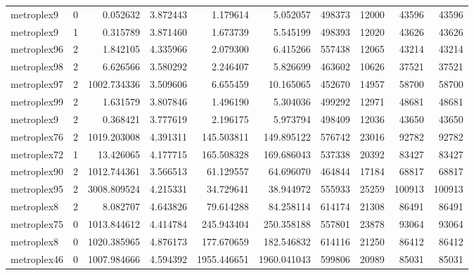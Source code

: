 \begin{longtable}{|l|r|r|r|r|r|r|r|r|r|}
metroplex9 & 0 & 0.052632 & 3.872443 & 1.179614 & 5.052057 & 498373 & 12000 & 43596 & 43596 \\
metroplex9 & 1 & 0.315789 & 3.871460 & 1.673739 & 5.545199 & 498393 & 12020 & 43626 & 43626 \\
metroplex96 & 2 & 1.842105 & 4.335966 & 2.079300 & 6.415266 & 557438 & 12065 & 43214 & 43214 \\
metroplex98 & 2 & 6.626566 & 3.580292 & 2.246407 & 5.826699 & 463602 & 10626 & 37521 & 37521 \\
metroplex97 & 2 & 1002.734336 & 3.509606 & 6.655459 & 10.165065 & 452670 & 14957 & 58700 & 58700 \\
metroplex99 & 2 & 1.631579 & 3.807846 & 1.496190 & 5.304036 & 499292 & 12971 & 48681 & 48681 \\
metroplex9 & 2 & 0.368421 & 3.777619 & 2.196175 & 5.973794 & 498409 & 12036 & 43650 & 43650 \\
metroplex76 & 2 & 1019.203008 & 4.391311 & 145.503811 & 149.895122 & 576742 & 23016 & 92782 & 92782 \\
metroplex72 & 1 & 13.426065 & 4.177715 & 165.508328 & 169.686043 & 537338 & 20392 & 83427 & 83427 \\
metroplex90 & 2 & 1012.744361 & 3.566513 & 61.129557 & 64.696070 & 464844 & 17184 & 68817 & 68817 \\
metroplex95 & 2 & 3008.809524 & 4.215331 & 34.729641 & 38.944972 & 555933 & 25259 & 100913 & 100913 \\
metroplex8 & 2 & 8.082707 & 4.643826 & 79.614288 & 84.258114 & 614174 & 21308 & 86491 & 86491 \\
metroplex75 & 0 & 1013.844612 & 4.414784 & 245.943404 & 250.358188 & 557801 & 23878 & 93064 & 93064 \\
metroplex8 & 0 & 1020.385965 & 4.876173 & 177.670659 & 182.546832 & 614116 & 21250 & 86412 & 86412 \\
metroplex46 & 0 & 1007.984666 & 4.594392 & 1955.446651 & 1960.041043 & 599806 & 20989 & 85031 & 85031 \\
\end{longtable}
